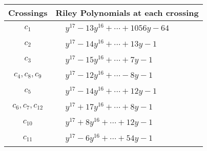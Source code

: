 \documentclass[1p]{elsarticle_modified}
\theoremstyle{definition}
\begin{document}
\begin{tabular}{m{50pt}|m{274pt}}
Crossings & \hspace{64pt}Riley Polynomials at each crossing \\
\hline $$\begin{aligned}c_{1}\end{aligned}$$&$\begin{aligned}
&y^{17}-13 y^{16}+\cdots+1056 y-64
\end{aligned}$\\
\hline $$\begin{aligned}c_{2}\end{aligned}$$&$\begin{aligned}
&y^{17}-14 y^{16}+\cdots+13 y-1
\end{aligned}$\\
\hline $$\begin{aligned}c_{3}\end{aligned}$$&$\begin{aligned}
&y^{17}-15 y^{16}+\cdots+7 y-1
\end{aligned}$\\
\hline $$\begin{aligned}c_{4},c_{8},c_{9}\end{aligned}$$&$\begin{aligned}
&y^{17}-12 y^{16}+\cdots-8 y-1
\end{aligned}$\\
\hline $$\begin{aligned}c_{5}\end{aligned}$$&$\begin{aligned}
&y^{17}-14 y^{16}+\cdots+12 y-1
\end{aligned}$\\
\hline $$\begin{aligned}c_{6},c_{7},c_{12}\end{aligned}$$&$\begin{aligned}
&y^{17}+17 y^{16}+\cdots+8 y-1
\end{aligned}$\\
\hline $$\begin{aligned}c_{10}\end{aligned}$$&$\begin{aligned}
&y^{17}+8 y^{16}+\cdots+12 y-1
\end{aligned}$\\
\hline $$\begin{aligned}c_{11}\end{aligned}$$&$\begin{aligned}
&y^{17}-6 y^{16}+\cdots+54 y-1
\end{aligned}$\\
\hline
\end{tabular}\\~\\
\end{document}
